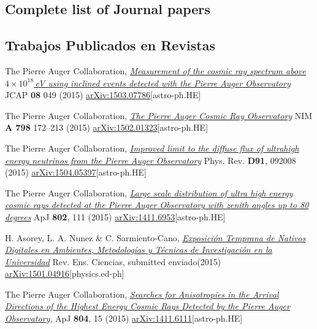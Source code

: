 \ifeng
\subsection*{Complete list of Journal papers}
\else
\subsection*{Trabajos Publicados en Revistas}
\fi
\noindent
\begin{etaremune}

\item {}The Pierre Auger Collaboration, \href{http://dx.doi.org/10.1088/1475-7516/2015/08/049}{\emph{Measurement of the cosmic ray spectrum above $4\times 10^{18}$\,eV using inclined events detected with the Pierre Auger Observatory}} JCAP {\bf{08}} 049 (2015) \href{http://arxiv.org/abs/1503.07786}{arXiv:1503.07786}[astro-ph.HE]

\item {}The Pierre Auger Collaboration, \href{http://dx.doi.org/10.1016/j.nima.2015.06.058}{\emph{The Pierre Auger Cosmic Ray Observatory}} NIM {\bf{A 798}} 172--213 (2015) \href{http://arxiv.org/abs/1502.01323}{arXiv:1502.01323}[astro-ph.HE]

\item {}The Pierre Auger Collaboration, \href{http://dx.doi.org/10.1103/PhysRevD.91.092008}{\emph{Improved limit to the diffuse flux of ultrahigh energy neutrinos from the Pierre Auger Observatory}} Phys. Rev. {\bf{D91}}, 092008 (2015) \href{http://arxiv.org/abs/1504.05397}{arXiv:1504.05397}[astro-ph.HE]

\item {}The Pierre Auger Collaboration, \href{http://dx.doi.org/}{\emph{Large scale distribution of ultra high energy cosmic rays detected at the Pierre Auger Observatory with zenith angles up to 80 degrees}} ApJ {\bf{802}}, 111 (2015) \href{http://arxiv.org/abs/1411.6953}{arXiv:1411.6953}[astro-ph.HE]

\item {} H. Asorey, L. A. Nunez \& C. Sarmiento-Cano, \href{http://dx.doi.org/}{\emph{Exposición Temprana de Nativos Digitales en Ambientes, Metodologías y Técnicas de Investigación en la Universidad}} Rev. Ens. Ciencias, \ifeng submitted \else enviado\fi (2015) \href{http://arxiv.org/abs/1501.04916}{arXiv:1501.04916}[physics.ed-ph]

\item {}The Pierre Auger Collaboration, \href{http://dx.doi.org/}{\emph{Searches for Anisotropies in the Arrival Directions of the Highest Energy Cosmic Rays Detected by the Pierre Auger Observatory}}, ApJ {\bf{804}}, 15 (2015) \href{http://arxiv.org/abs/1411.6111}{arXiv:1411.6111}[astro-ph.HE]


\end{etaremune}
